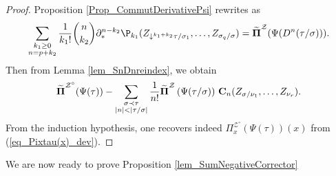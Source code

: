 \documentclass[11pt]{preprint}
\newcommand{\mcZ}{\mathcal{Z}}
\def\PPi{\boldsymbol{\Pi}}
\def\eqref#1{(\ref{#1})}
\newcommand{\bfC}{{\bf C}}
\begin{document}
\begin{proof}
		Proposition \ref{Prop_CommutDerivativePsi} rewrites as 
		$$
	\sum_{\substack{k_1\geq 0 \\ n=p+k_2}} \frac{1}{k_1!}\binom{n}{k_2}     \partial^{n-k_2}_*\P_{k_1}(Z_{\downarrow^{k_1+k_2}\tau/\sigma_1},\dots,Z_{\sigma_q/\sigma}) =  \widetilde{\PPi}^\mcZ( \Psi( D^{n}(\tau/\sigma)  )  ). 
		$$
		Then from Lemma \ref{lem_SnDnreindex}, we obtain 
		\begin{align*}
			\widetilde{\PPi}^{\mcZ^\circ}(\Psi(\tau)) - \sum_{\substack{\sigma\prec\tau \\ |n|<|\tau/\sigma|}}\frac{1}{n!} \widetilde{\PPi}^\mcZ\left( \Psi( \tau/\sigma  )  \right) \, \bfC_{n}( Z_{\sigma/\nu_1},\dots, Z_{\nu_r}).
		\end{align*}
	From the induction hypothesis, one recovers indeed $\Pi_x^{\mcZ^\circ}(\Psi(\tau))(x)$ from \eqref{eq_Pixtau(x)_dev}.
	
	
\end{proof}
We are now ready to prove Proposition \ref{lem_SumNegativeCorrector}
\end{document}
